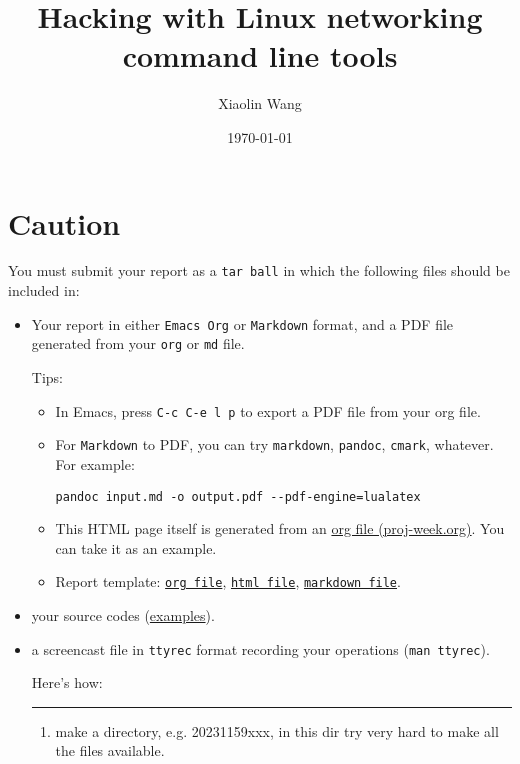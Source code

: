 \documentclass{article}
\author{Xiaolin Wang}
\date{\today}
\title{Hacking with Linux networking command line tools}
\begin{document}
\maketitle
\tableofcontents


\section{Caution}
\label{sec:org78dbaf4}
You must submit your report as a \texttt{tar ball} in which the following files
should be included in:

\begin{itemize}
\item Your report in either \texttt{Emacs Org} or \texttt{Markdown} format, and a PDF file
generated from your \texttt{org} or \texttt{md} file.

Tips: 
\begin{itemize}
\item In Emacs, press \texttt{C-c C-e l p} to export a PDF file from your org file.

\item For \texttt{Markdown} to PDF, you can try \texttt{markdown}, \texttt{pandoc}, \texttt{cmark},
whatever. For example:

\begin{verbatim}
pandoc input.md -o output.pdf --pdf-engine=lualatex
\end{verbatim}

\item This HTML page itself is generated from an \href{proj-week.org}{org file
(proj-week.org)}. You can take it as an example.

\item Report template: \href{20231159xxx.org}{\texttt{org file}}, \href{20231159xxx.pdf}{\texttt{html file}}, \href{20231159xxx.md}{\texttt{markdown file}}.
\end{itemize}

\item your source codes (\href{https://cs6.swfu.edu.cn/\~wx672/lecture\_notes/network\_basics/scripts/}{examples}).

\item a screencast file in \texttt{ttyrec} format recording your operations (\texttt{man ttyrec}).

Here's how:

\noindent\rule{\textwidth}{0.5pt}
\begin{enumerate}
\item make a directory, e.g. 20231159xxx, in this dir try very hard to make all
the files available.


\end{enumerate}
\end{itemize}
\end{document}
